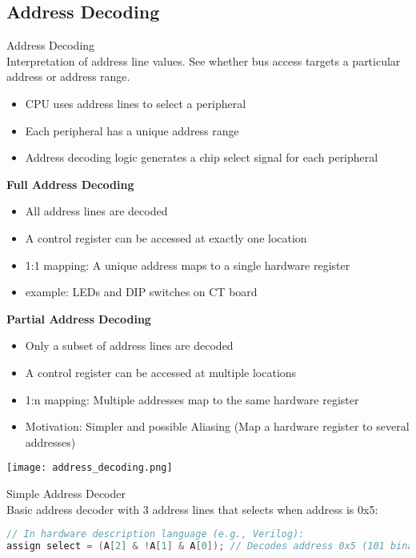 \subsection{Address Decoding}

\begin{definition}{Address Decoding}\\
    Interpretation of address line values. See whether bus access targets a particular address or address range.
    \begin{itemize}
        \item CPU uses address lines to select a peripheral
        \item Each peripheral has a unique address range
        \item Address decoding logic generates a chip select signal for each peripheral
    \end{itemize}

    \textbf{Full Address Decoding}
    \begin{itemize}
        \item All address lines are decoded
        \item A control register can be accessed at exactly one location
        \item 1:1 mapping: A unique address maps to a single hardware register
        \item example: LEDs and DIP switches on CT board
    \end{itemize}

    \textbf{Partial Address Decoding}
    \begin{itemize}
        \item Only a subset of address lines are decoded
        \item A control register can be accessed at multiple locations
        \item 1:n mapping: Multiple addresses map to the same hardware register
        \item Motivation: Simpler and possible Aliasing (Map a hardware register to several addresses)
    \end{itemize}
    \texttt{[image: address\_decoding.png]}
\end{definition}

\begin{examplecode}{Simple Address Decoder}\\
Basic address decoder with 3 address lines that selects when address is 0x5:
\begin{lstlisting}[language=C, style=basesmol]
// In hardware description language (e.g., Verilog):
assign select = (A[2] & !A[1] & A[0]); // Decodes address 0x5 (101 binary)
\end{lstlisting}
\end{examplecode}

